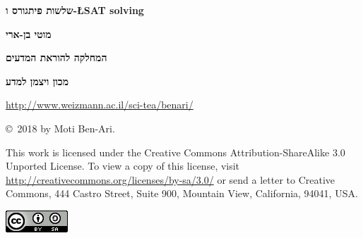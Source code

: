 \documentclass[12pt,a4paper]{article}
\begin{document}
\thispagestyle{empty}


\begin{center}
\textbf{\Huge שלשות פיתגורס ו-\L{SAT solving}}

\bigskip
\bigskip

\textbf{\Large מוטי בן-ארי}

\bigskip

\textbf{\Large המחלקה להוראת המדעים}

\bigskip

\textbf{\Large מכון ויצמן למדע}

\bigskip

\url{http://www.weizmann.ac.il/sci-tea/benari/}

\bigskip

\end{center}


\begin{center}
\copyright{}\  2018 by Moti Ben-Ari.
\end{center}

\begin{footnotesize}
This work is licensed under the Creative Commons Attribution-ShareAlike 3.0 Unported License. To view a copy of this license, visit \url{http://creativecommons.org/licenses/by-sa/3.0/} or send a letter to Creative Commons, 444 Castro Street, Suite 900, Mountain View, California, 94041, USA.
\end{footnotesize}

\bigskip

\begin{center}
\includegraphics[width=.2\textwidth]{../by-sa.png}
\end{center}

\bigskip

\newpage


\section{}
\end{document}
